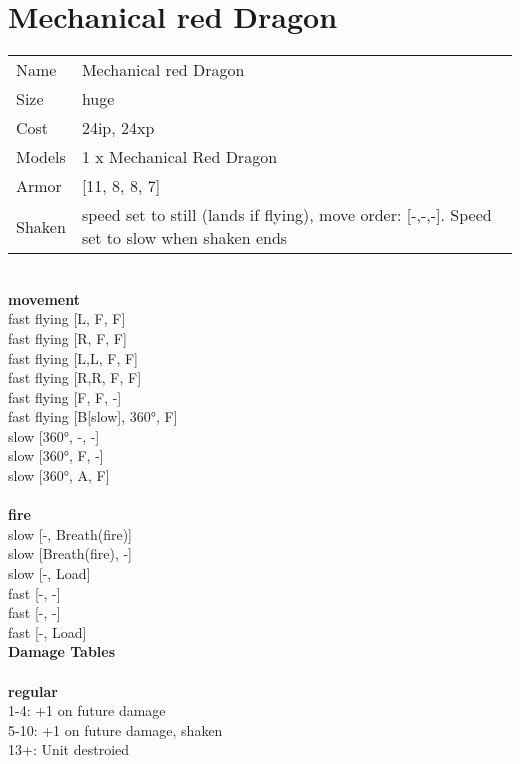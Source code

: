 \clearpage

\section{ Mechanical red Dragon }

\begin{tabular}{ll}
  Name & Mechanical red Dragon \\
  Size & huge\\
  Cost & 24ip, 24xp\\
  Models & 1 x Mechanical Red Dragon\\
  Armor & [11, 8, 8, 7]\\
  Shaken & speed set to still (lands if flying), move order: [-,-,-]. Speed set to slow when shaken ends\\
\end{tabular}

\noindent 

\ \\ {\bf movement } \\
fast flying [L, F, F] \\
fast flying [R, F, F] \\
fast flying [L,L, F, F] \\
fast flying [R,R, F, F] \\
fast flying [F, F, -] \\
fast flying [B[slow], 360°, F] \\
slow [360°, -, -] \\
slow [360°, F, -] \\
slow [360°, A, F] \\
\ \\ {\bf fire } \\
slow [-, Breath(fire)] \\
slow [Breath(fire), -] \\
slow [-, Load] \\
fast [-, -] \\
fast [-, -] \\
fast [-, Load] \\


{\bf Damage Tables} \\
\ \\ {\bf regular } \\
1-4: +1 on future damage \\
5-10: +1 on future damage, shaken \\
13+: Unit destroied \\


